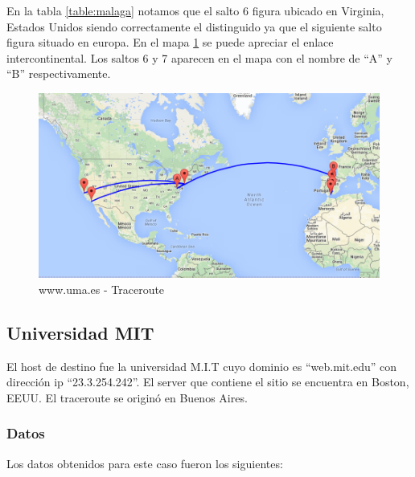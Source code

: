 En la tabla \ref{table:malaga} notamos que el salto 6 figura ubicado en Virginia, Estados Unidos siendo correctamente el distinguido ya que el siguiente salto figura situado en europa. En el mapa \ref{mapa:malaga} se puede apreciar el enlace intercontinental. Los saltos 6 y 7 aparecen en el mapa con el nombre de ``A'' y ``B'' respectivamente.


\begin{figure}[H]
    \begin{center}
        \includegraphics[width=1\textwidth]{data/mapa-malaga.png}
        \caption{www.uma.es - Traceroute}
        \label{mapa:malaga}
    \end{center}
\end{figure}






\subsection{Universidad MIT}
El host de destino fue la universidad M.I.T cuyo dominio es ``web.mit.edu'' con dirección ip ``23.3.254.242''. El server que contiene el sitio se encuentra en Boston, EEUU. El traceroute se originó en Buenos Aires.


\subsubsection{Datos}

Los datos obtenidos para este caso fueron los siguientes:

